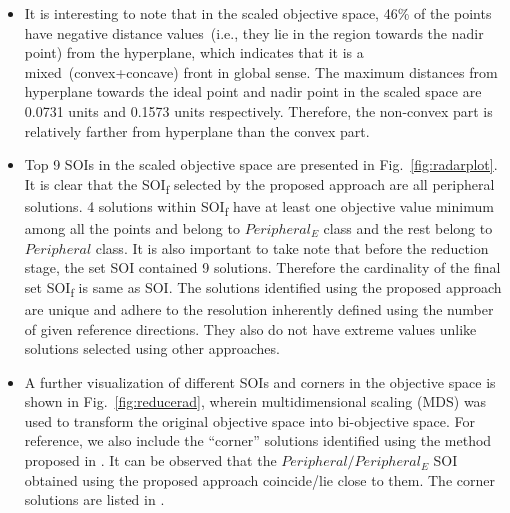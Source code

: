 \begin{figure*}[!htb]
	\centering    
	\caption{Radar: (a) EMU\textsuperscript{r}, (b) EMU, (c) Convex Bulge, (d) SOIs}
	\label{fig:radarplot}
\end{figure*}

\begin{itemize}
	\setlength\itemsep{0em}
	\item It is interesting to note that in the scaled objective space, 46\% of the points have negative distance values~(i.e., they lie in the region towards the nadir point) from the hyperplane, which indicates that it is a mixed~(convex+concave) front in global sense. The maximum distances from hyperplane towards the ideal point and nadir point in the scaled space are 0.0731 units and 0.1573 units respectively. Therefore, the non-convex part is relatively farther from hyperplane than the convex part.   
	\item Top 9 SOIs in the scaled objective space are presented in Fig.~\ref{fig:radarplot}. It is clear that the SOI\textsubscript{f} selected by the proposed approach are all peripheral solutions. 4 solutions within SOI\textsubscript{f} have at least one objective value minimum among all the points and belong to $Peripheral_E$ class and the rest belong to $Peripheral$ class. It is also important to take note that before the reduction stage, the set SOI contained 9 solutions. Therefore the cardinality of the final set SOI\textsubscript{f} is same as SOI. The solutions identified using the proposed approach are unique and adhere to the resolution inherently defined using the number of given reference directions. They also do not have extreme values unlike solutions selected using other approaches.
	\item  A further visualization of different SOIs and corners in the objective space is shown in Fig.~\ref{fig:reducerad}, wherein multidimensional scaling (MDS) \cite{drtoolbox} was used to transform the original objective space into bi-objective space. For reference, we also include the ``corner'' solutions identified using the method proposed in \cite{singh2011corner}. It can be observed that the $Peripheral/Peripheral_E$ SOI obtained using the proposed approach coincide/lie close to them. The corner solutions are listed in \cite{benchmark}.
	
\end{itemize}


